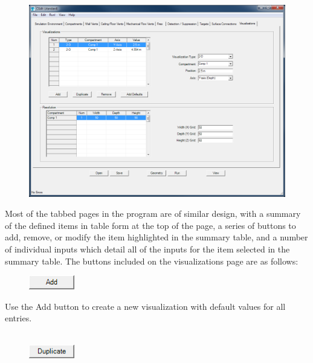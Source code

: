 \begin{figure}[h!]
\begin{center}
\includegraphics[width=6.5in]{FIGURES/Input_File/Visualizations_Tab}
\end{center}
\end{figure}

Most of the tabbed pages in the program are of similar design, with a summary of the defined items in table form at the top of the page, a series of buttons to add, remove, or modify the item highlighted in the summary table, and a number of individual inputs which detail all of the inputs for the item selected in the summary table. The buttons included on the visualizations page are as follows: \\

\begin{figure}
  \includegraphics[width=0.781in]{FIGURES/Input_File/Add_Button}
\end{figure}

Use the Add button to create a new visualization with default values for all entries. \\~ \\

\begin{figure}
  \includegraphics[width=0.781in]{FIGURES/Input_File/Duplicate_Button}
\end{figure}

